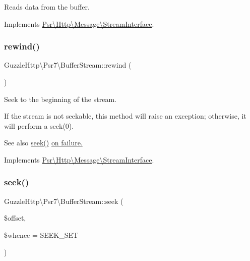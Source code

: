 Reads data from the buffer. 

Implements \hyperlink{interfacePsr_1_1Http_1_1Message_1_1StreamInterface_ad41b4afe827e179dfb4b988e98cccb12}{Psr\textbackslash{}\+Http\textbackslash{}\+Message\textbackslash{}\+Stream\+Interface}.

\mbox{\label{classGuzzleHttp_1_1Psr7_1_1BufferStream_a93beb4e6194db7b3ce2f39748d99fdc0}} 
\subsubsection{\texorpdfstring{rewind()}{rewind()}}
{\footnotesize\ttfamily Guzzle\+Http\textbackslash{}\+Psr7\textbackslash{}\+Buffer\+Stream\+::rewind (\begin{DoxyParamCaption}{ }\end{DoxyParamCaption})}

Seek to the beginning of the stream.

If the stream is not seekable, this method will raise an exception; otherwise, it will perform a seek(0).

\begin{DoxySeeAlso}{See also}
\hyperlink{classGuzzleHttp_1_1Psr7_1_1BufferStream_a0ac3c779324ec9a9534519f71aab5ad0}{seek()} \hyperlink{}{on failure. }
\end{DoxySeeAlso}


Implements \hyperlink{interfacePsr_1_1Http_1_1Message_1_1StreamInterface_a48721ef4d5097250a3f94515938393c9}{Psr\textbackslash{}\+Http\textbackslash{}\+Message\textbackslash{}\+Stream\+Interface}.

\mbox{\label{classGuzzleHttp_1_1Psr7_1_1BufferStream_a0ac3c779324ec9a9534519f71aab5ad0}} 
\subsubsection{\texorpdfstring{seek()}{seek()}}
{\footnotesize\ttfamily Guzzle\+Http\textbackslash{}\+Psr7\textbackslash{}\+Buffer\+Stream\+::seek (\begin{DoxyParamCaption}\item[{}]{\$offset,  }\item[{}]{\$whence = {\ttfamily SEEK\+\_\+SET} }\end{DoxyParamCaption})}

